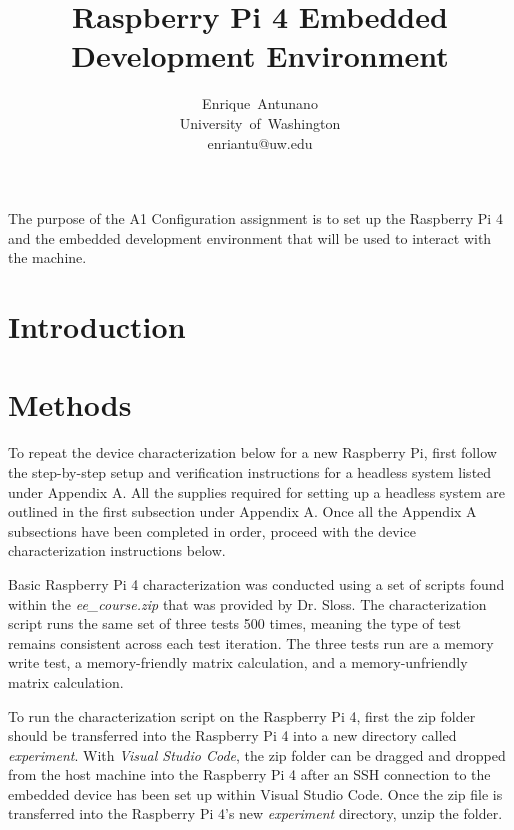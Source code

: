 \documentclass[journal]{IEEEtran}
\begin{document}
    \title{Raspberry Pi 4 Embedded Development Environment}

    \author{Enrique~Antunano\\University~of~Washington\\enriantu@uw.edu}


    \maketitle

    \begin{abstract}

    \end{abstract}
    The purpose of the A1 Configuration assignment is to set up the Raspberry Pi 4 and the embedded development environment that will be used to interact with the machine. 
    \section{Introduction}

    \section{Methods}
    To repeat the device characterization below for a new Raspberry Pi, first follow the step-by-step setup and verification instructions for a headless system listed under Appendix A. 
    All the supplies required for setting up a headless system are outlined in the first subsection under Appendix A.
    Once all the Appendix A subsections have been completed in order, proceed with the device characterization instructions below.

    Basic Raspberry Pi 4 characterization was conducted using a set of scripts found within the \emph{ee\_course.zip} that was provided by Dr. Sloss. 
    The characterization script runs the same set of three tests 500 times, meaning the type of test remains consistent across each test iteration.
    The three tests run are a memory write test, a memory-friendly matrix calculation, and a memory-unfriendly matrix calculation.

    To run the characterization script on the Raspberry Pi 4, first the zip folder should be transferred into the Raspberry Pi 4 into a new directory called \emph{experiment}.
    With \emph{Visual Studio Code}, the zip folder can be dragged and dropped from the host machine into the Raspberry Pi 4 after an SSH connection to the embedded device has been set up within Visual Studio Code.
    Once the zip file is transferred into the Raspberry Pi 4's new \emph{experiment} directory, unzip the folder. \newline
\end{document}

